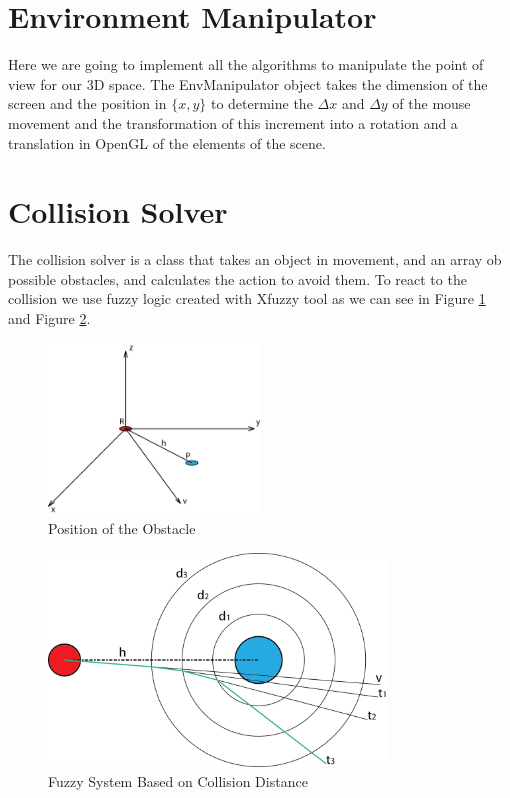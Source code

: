\documentclass[12pt,a4paper,oneside,english]{book}
\begin{document}
\section{Environment Manipulator}

Here we are going to implement all the algorithms to manipulate the point of view for our 3D space. The EnvManipulator object takes the dimension of the screen and the position in $\{x,y\}$ to determine the $\Delta x$ and $\Delta y$ of the mouse movement and the transformation of this increment into a rotation and a translation in OpenGL of the elements of the scene.

\section{Collision Solver}

The collision solver is a class that takes an object in movement, and an array ob possible obstacles, and calculates the action to avoid them. To react to the collision we use fuzzy logic created with Xfuzzy tool as we can see in Figure \ref{position of the obstacle} and Figure \ref{fuzzy system based on collision distance}.

\begin{figure}[htbp]
  \begin{center}
    \includegraphics[width=0.5\textwidth]{images/AC01.png}
    \caption{Position of the Obstacle}
    \label{position of the obstacle}
  \end{center}
\end{figure}

\begin{figure}[htbp]
  \begin{center}
    \includegraphics[width=0.8\textwidth]{images/AC02.png}
    \caption{Fuzzy System Based on Collision Distance}
    \label{fuzzy system based on collision distance}
  \end{center}
\end{figure}
\end{document}
